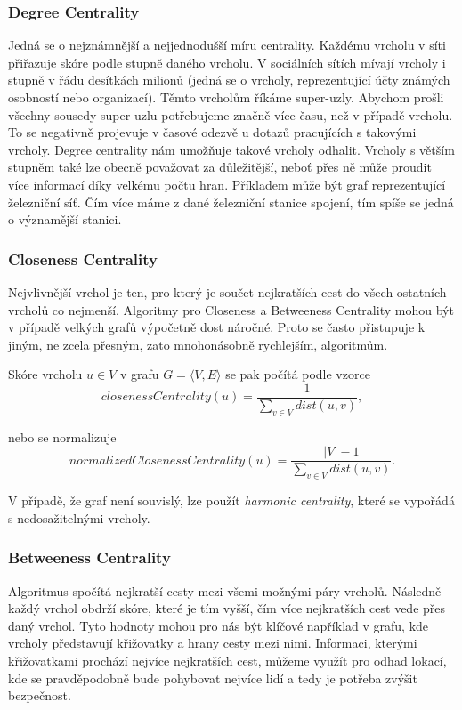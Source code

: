 \documentclass[
  program=infoi,
  biblatex=true,
  sourcecodes=true,
  figures=true,
  glossaries=false,
  index
]{kidiplom}
\begin{document}
\subsubsection{Degree Centrality}
Jedná se o nejznámnější a nejjednodušší míru centrality. Každému vrcholu v síti přiřazuje skóre podle stupně daného vrcholu. V sociálních sítích mívají vrcholy i stupně v řádu desítkách milionů (jedná se o vrcholy, reprezentující účty známých osobností nebo organizací). Těmto vrcholům říkáme super-uzly. Abychom prošli všechny sousedy super-uzlu potřebujeme značně více času, než v případě  vrcholu. To se negativně projevuje v časové odezvě u dotazů pracujících s takovými vrcholy. Degree centrality nám umožňuje takové vrcholy odhalit. Vrcholy s větším stupněm také lze obecně považovat za důležitější, neboť přes ně může proudit více informací díky velkému počtu hran. Příkladem může být graf reprezentující železniční síť. Čím více máme z dané železniční stanice spojení, tím spíše se jedná o významější stanici.

\subsubsection{Closeness Centrality}
Nejvlivnější vrchol je ten, pro který je součet nejkratších cest do všech ostatních vrcholů co nejmenší. Algoritmy pro Closeness a Betweeness Centrality mohou být v případě velkých grafů výpočetně dost náročné. Proto se často přistupuje k jiným, ne zcela přesným, zato mnohonásobně rychlejším, algoritmům.

Skóre vrcholu $ u \in V $ v grafu $G = \langle V,E\rangle$ se pak počítá podle vzorce
\begin{equation}
\label{eq:closenessCentrality}
closenessCentrality(u) = \frac{1}{ \sum_{ v \in V }{ dist(u,v) } },
\end{equation}

nebo se normalizuje
\begin{equation}
\label{eq:normalizedClosenessCentrality}
normalizedClosenessCentrality(u) = \frac{ |V| - 1 }{ \sum_{ v \in V }{ dist(u,v) } } .
\end{equation}

V případě, že graf není souvislý, lze použít \textit{harmonic centrality}, které se vypořádá s nedosažitelnými vrcholy.

\subsubsection{Betweeness Centrality}
Algoritmus spočítá nejkratší cesty mezi všemi možnými páry vrcholů. Následně každý vrchol obdrží skóre, které je tím vyšší, čím více nejkratších cest vede přes daný vrchol. Tyto hodnoty mohou pro nás být klíčové například v grafu, kde vrcholy představují křižovatky a hrany cesty mezi nimi. Informaci, kterými křižovatkami prochází nejvíce nejkratších cest, můžeme využít pro odhad lokací, kde se pravděpodobně bude pohybovat nejvíce lidí a tedy je potřeba zvýšit bezpečnost.
\end{document}
